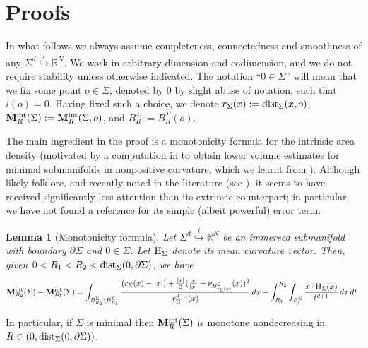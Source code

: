 \documentclass{article}
\newcommand{\R}{\mathbb{R}}
\newtheorem{lemma}[theorem]{Lemma}
\theoremstyle{definition}
\begin{document}
\section{Proofs}\label{sec:proofthm}
In what follows we always assume completeness, connectedness and smoothness of any $\Sigma^d\overset{i}{\hookrightarrow}\R^N$. We work in arbitrary dimension and codimension, and we do not require stability unless otherwise indicated. The notation ``$0\in\Sigma$'' will mean that we fix some point $o\in\Sigma$, denoted by $0$ by slight abuse of notation, such that  $i(o)=0$. Having fixed such a choice, we denote $r_\Sigma(x):={\rm dist}_\Sigma(x,o)$, ${\bf M}_R^{\rm int}(\Sigma):={\bf M}_R^{\rm int}(\Sigma,o)$, and $B_R^\Sigma:=B_R^\Sigma(o)$.

The main ingredient in the proof is a monotonicity formula for the intrinsic area density (motivated by a computation in \cite[Section 7]{Yau75} to obtain lower volume estimates for minimal submanifolds in nonpositive curvature, which we learnt from \cite[Lemma 8.9]{Cho21notes}). Although likely folklore, and recently noted in the literature (see \cite[Proof of Proposition 2.4]{MP24}), it seems to have received significantly less attention than its extrinsic counterpart; in particular, we have not found a reference for its simple (albeit powerful) error term.
\begin{lemma}[Monotonicity formula]\label{lem:monformula}
    Let $\Sigma^d\overset{i}{\hookrightarrow}\R^N$ be an immersed submanifold with boundary $\partial\Sigma$ and $0\in\Sigma$. Let ${\rm H}_\Sigma$ denote its mean curvature vector. Then, given $0<R_1<R_2<{\rm dist}_\Sigma(0,\partial \Sigma)$, we have
    \begin{equation}\label{eq:monfor}
        {\bf M}_{R_2}^{\rm int}(\Sigma)-{\bf M}_{R_1}^{\rm int}(\Sigma)=
\int_{B_{R_2}^\Sigma\setminus B_{R_1}^\Sigma} \frac{(r_\Sigma(x)-|x|)+\frac{|x|}{2}(\frac{x}{|x|}-\nu_{B_{r_\Sigma(x)}^\Sigma}(x))^2}{r_\Sigma^{d+1}(x)}\,dx+\int_{R_1}^{R_2}\int_{B_{t}^\Sigma} \frac{x\cdot{\rm H}_\Sigma(x)}{t^{d+1}}\,dx\,dt\,.
\end{equation}
\end{lemma}
In particular, if $\Sigma$ is minimal then ${\bf M}_R^{\rm int}(\Sigma)$ is monotone nondecreasing in $R\in(0,{\rm dist}_\Sigma(0,\partial \Sigma))$.
\end{document}
